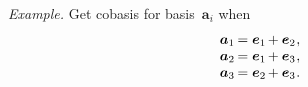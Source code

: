 \begin{otherlanguage}{russian}
\begin{tcolorbox}
\small\setlength{\abovedisplayskip}{2pt}\setlength{\belowdisplayskip}{2pt}

\emph{Example.} Get cobasis for basis~$\bm{a}_i$ when
\[ \begin{array}{l}
\bm{a}_1 \hspace{-0.2ex} = \bm{e}_1 \hspace{-0.2ex} + \bm{e}_2 \hspace{.1ex} , \\
\bm{a}_2 \hspace{-0.2ex} = \bm{e}_1 \hspace{-0.2ex} + \bm{e}_3 \hspace{.1ex} , \\
\bm{a}_3 \hspace{-0.2ex} = \bm{e}_2 \hspace{-0.2ex} + \bm{e}_3 \hspace{.1ex} .
\end{array} \]


\end{tcolorbox}
\end{otherlanguage}
